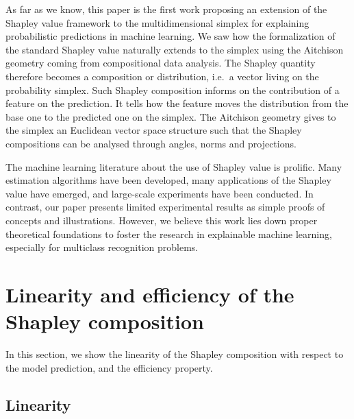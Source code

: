 \documentclass{article}
\theoremstyle{plain}
\theoremstyle{definition}
\theoremstyle{remark}
\begin{document}
As far as we know, this paper is the first work proposing an extension of the Shapley value framework to the multidimensional simplex for explaining probabilistic predictions in machine learning. We saw how the formalization of the standard Shapley value naturally extends to the simplex using the Aitchison geometry coming from compositional data analysis. The Shapley quantity therefore becomes a composition or distribution, i.e.~a vector living on the probability simplex. Such Shapley composition informs on the contribution of a feature on the prediction. It tells how the feature moves the distribution from the base one to the predicted one on the simplex. The Aitchison geometry gives to the simplex an Euclidean vector space structure such that the Shapley compositions can be analysed through angles, norms and projections.

The machine learning literature about the use of Shapley value is prolific. Many estimation algorithms have been developed, many applications of the Shapley value have emerged, and large-scale experiments have been conducted. In contrast, our paper presents limited experimental results as simple proofs of concepts and illustrations. However, we believe this work lies down proper theoretical foundations to foster the research in explainable machine learning, especially for multiclass recognition problems.

\nocite{langley00}





\newpage
\appendix
\onecolumn

\section{Linearity and efficiency of the Shapley composition}
\label{app:properties}
In this section, we show the linearity of the Shapley composition with respect to the model prediction, and the efficiency property.

\subsection{Linearity}
\end{document}
